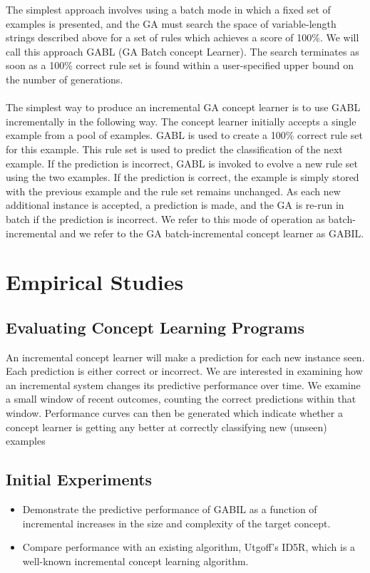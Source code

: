 \documentclass[../main.tex]{subfiles}
\begin{document}
The simplest approach involves using a batch mode in which a fixed set of examples is presented, and the GA must search
the space of variable-length strings described above for a set of rules which achieves a score of 100\%. We will call
this approach GABL (GA Batch concept Learner). The search terminates as soon as a 100\% correct rule set is found
within a user-specified upper bound on the number of generations.
\\\\
The simplest way to produce an incremental GA concept learner is to use GABL incrementally in the following way. The
concept learner initially accepts a single example from a pool of examples. GABL is used to create a 100\% correct rule
set for this example. This rule set is used to predict the classification of the next example. If the prediction is
incorrect, GABL is invoked to evolve a new rule set using the two examples. If the prediction is correct, the example
is simply stored with the previous example and the rule set remains unchanged. As each new additional instance is
accepted, a prediction is made, and the GA is re-run in batch if the prediction is incorrect. We refer to this mode of
operation as batch-incremental and we refer to the GA batch-incremental concept learner as GABIL.

\section{Empirical Studies}

\subsection{Evaluating Concept Learning Programs}

An incremental concept learner will make a prediction for each new instance seen. Each prediction is either correct or
incorrect. We are interested in examining how an incremental system changes its predictive performance over time. We
examine a small window of recent outcomes, counting the correct predictions within that window. Performance curves can
then be generated which indicate whether a concept learner is getting any better at correctly classifying new (unseen)
examples

\subsection{Initial Experiments}

\begin{itemize}
	\item Demonstrate the predictive performance of GABIL as a function of incremental increases in the size and
	complexity of the target concept.
	\item Compare performance with an existing algorithm, Utgoff’s ID5R, which is a well-known incremental concept
	learning algorithm.
\end{itemize}
\end{document}
